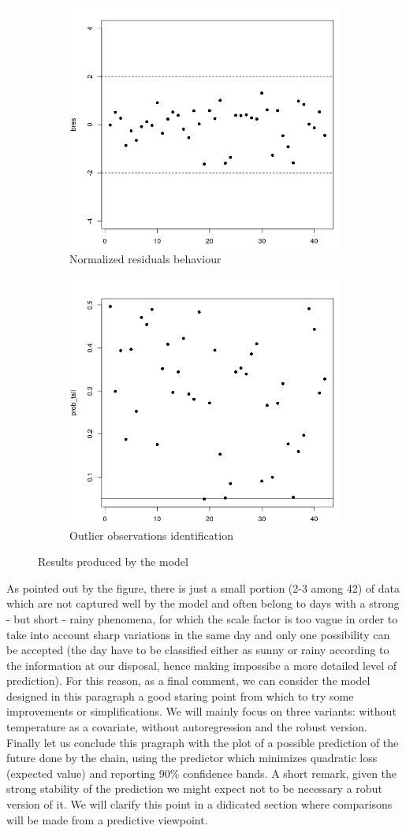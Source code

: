 \documentclass[11pt,twoside]{report}
\begin{document}
\begin{figure}[H]
	\begin{subfigure}[H]{0.5\linewidth}
		\centering
		\includegraphics[width=70 mm]{pictures/m2_bres.png}
		\caption{Normalized residuals behaviour}
		\label{fig:M2_res}
	\end{subfigure}
	\hfill
	\begin{subfigure}[H]{0.5\linewidth}
		\centering
		\includegraphics[width=70 mm]{pictures/m2_out.png}
		\caption{Outlier observations identification}
		\label{fig:M2_out}
	\end{subfigure}%
	\caption{Results produced by the model}
\end{figure}

As pointed out by the figure, there is just a small portion (2-3 among 42) of data which are not captured well by the model and often belong to days with a strong - but short - rainy phenomena, for which the scale factor is too vague in order to take into account sharp variations in the same day and only one possibility can be accepted (the day have to be classified either as sunny or rainy according to the information at our disposal, hence making impossibe a more detailed level of prediction). For this reason, as a final comment, we can consider the model designed in this paragraph a good staring point from which to try some improvements or simplifications. We will mainly focus on three variants: without temperature as a covariate, without autoregression and the robust version. Finally let us conclude this pragraph with the plot of a possible prediction of the future done by the chain, using the predictor which minimizes quadratic loss (expected value) and reporting 90\% confidence bands. A short remark, given the strong stability of the prediction we might expect not to be necessary a robut version of it. We will clarify this point in a didicated section where comparisons will be made from a predictive viewpoint.
\end{document}
